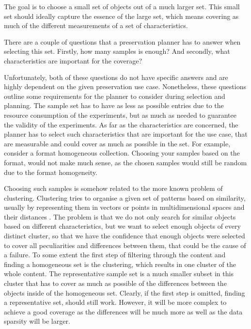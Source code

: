 The goal is to choose a small set of objects out of a much larger set.
This small set should ideally capture the essence of the large set, which means covering as much of the different measurements of a set of characteristics.

There are a couple of questions that a preservation planner has to answer when selecting this set.
Firstly, how many samples is enough?
And secondly, what characteristics are important for the coverage?

Unfortunately, both of these questions do not have specific answers and are highly dependent on the given preservation use case.
Nonetheless, these questions outline some requirements for the planner to consider during selection and planning.
The sample set has to have as less as possible entries due to the resource consumption of the experiments, but as much as needed to guarantee the validity of the experiments.
As far as the characteristics are concerned, the planner has to select such characteristics that are important for the use case, that are measurable and could cover as much as possible in the set.
For example, consider a format homogeneous collection.
Choosing your samples based on the format, would not make much sense, as the chosen samples would still be random due to the format homogeneity.

Choosing such samples is somehow related to the more known problem of clustering.
Clustering tries to organise a given set of patterns based on similarity, usually by representing them in vectors or points in multidimensional spaces and their distances \cite{Jain:1999:DCR:331499.331504}.
The problem is that we do not only search for similar objects based on different characteristics, but we want to select enough objects of every distinct cluster, so that we have the confidence that enough objects were selected to cover all peculiarities and differences between them, that could be the cause of a failure.
To some extent the first step of filtering through the content and finding a homogeneous set is the clustering, which results   in one cluster of the whole content. The representative sample set is a much smaller subset in this cluster that has to cover as much as possible of the differences between the objects inside of the homogeneous set. Clearly, if the first step is omitted, finding a representative set, should still work. However, it will be more complex to achieve a good coverage as the differences will be much more as well as the data sparsity will be larger. 